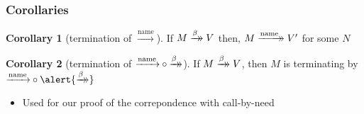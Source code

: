 \documentclass[dvipdfmx,cjk,xcolor=dvipsnames,envcountsect,notheorems,12pt]{beamer}
\theoremstyle{definition}
\newtheorem{corollary}{Corollary}
\newcommand{\xtwoheadrightarrow}[2][]{%
  \xrightarrow[#1]{#2}\mathrel{\mkern-14mu}\rightarrow
}
\newcommand{\CALLBYNAME}{\xrightarrow{\mathrm{name}}}
\newcommand{\RTCLOSFULLBETA}{\xtwoheadrightarrow{\beta}}
\newcommand{\RTCLOSCALLBYNAME}{\xtwoheadrightarrow{\mathrm{name}}}
\begin{document}
\begin{frame}
	\frametitle{Corollaries}
	\Large
	\begin{corollary}[termination of $\CALLBYNAME$]
		If $M \RTCLOSFULLBETA V$ then, $M \RTCLOSCALLBYNAME V'$ for some $N$
	\end{corollary}
	\begin{corollary}[termination of ${\CALLBYNAME}\circ{\RTCLOSFULLBETA}$]
		If $M \RTCLOSFULLBETA V$, then
		$M$ is terminating by ${\CALLBYNAME}\circ{\alert{\RTCLOSFULLBETA}}$
	\end{corollary}
	\begin{itemize}
		\item Used for our proof of the correpondence with call-by-need
	\end{itemize}
\end{frame}
\end{document}
